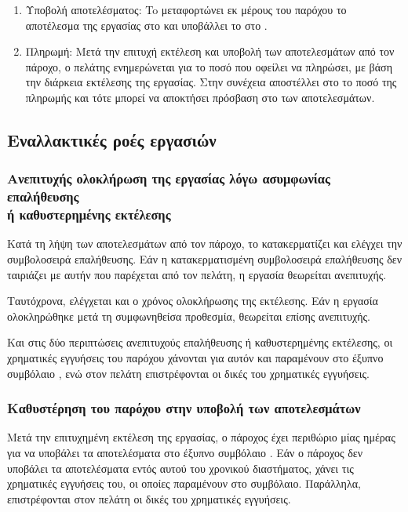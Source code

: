\begin{enumerate}
    \item Υποβολή αποτελέσματος: To  μεταφορτώνει εκ μέρους του παρόχου το αποτέλεσμα της εργασίας στο  και υποβάλλει το  στο  \textit{}.
    \item Πληρωμή: Μετά την επιτυχή εκτέλεση και υποβολή των αποτελεσμάτων από τον πάροχο, ο πελάτης ενημερώνεται για το ποσό που οφείλει να πληρώσει, με βάση την διάρκεια εκτέλεσης της εργασίας. Στην συνέχεια αποστέλλει στο  \textit{} το ποσό της πληρωμής και τότε μπορεί να αποκτήσει πρόσβαση στο  των αποτελεσμάτων.
\end{enumerate}

\subsection{Εναλλακτικές ροές εργασιών}
\subsubsection{Ανεπιτυχής ολοκλήρωση της εργασίας λόγω ασυμφωνίας επαλήθευσης \\ή καθυστερημένης εκτέλεσης}
Κατά τη λήψη των αποτελεσμάτων από τον πάροχο, το  κατακερματίζει και ελέγχει την συμβολοσειρά επαλήθευσης.
Εάν η κατακερματισμένη συμβολοσειρά επαλήθευσης δεν ταιριάζει με αυτήν που παρέχεται από τον πελάτη, η εργασία θεωρείται ανεπιτυχής.

Ταυτόχρονα, ελέγχεται και ο χρόνος ολοκλήρωσης της εκτέλεσης. Εάν η εργασία ολοκληρώθηκε μετά τη συμφωνηθείσα προθεσμία, θεωρείται επίσης ανεπιτυχής.

Και στις δύο περιπτώσεις ανεπιτυχούς επαλήθευσης ή καθυστερημένης εκτέλεσης, οι χρηματικές εγγυήσεις του παρόχου χάνονται για αυτόν και παραμένουν στο έξυπνο συμβόλαιο , ενώ στον πελάτη επιστρέφονται οι δικές του χρηματικές εγγυήσεις.

\subsubsection{Καθυστέρηση του παρόχου στην υποβολή των αποτελεσμάτων}
Μετά την επιτυχημένη εκτέλεση της εργασίας, ο πάροχος έχει περιθώριο μίας ημέρας για να υποβάλει τα αποτελέσματα στο έξυπνο συμβόλαιο . Εάν ο πάροχος δεν υποβάλει τα αποτελέσματα εντός αυτού του χρονικού διαστήματος, χάνει τις χρηματικές εγγυήσεις του, οι οποίες παραμένουν στο συμβόλαιο. Παράλληλα, επιστρέφονται στον πελάτη οι δικές του χρηματικές εγγυήσεις.

